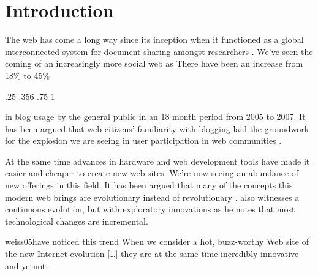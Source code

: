 \chapter{Introduction}
\label{chapter:introduction}

The web has come a long way since its inception when it functioned as a
global interconnected system for document sharing amongst researchers
\citep[]{bernerslee92}. We've
seen the coming of an increasingly more social web as
There have been
an increase from 18\% to 45\%
\begin{sparkline}{3}
  \sparkspike .25  .356
  \sparkspike .75  1
\end{sparkline}
in blog usage by the general public%
in an 18 month period from 2005 to 2007.
It has been argued that web citizens'
familiarity with blogging laid the groundwork for the explosion we are seeing
in user participation in web communities
.

At the same time advances in hardware and web development tools have made it
easier and cheaper to create new web sites. We're now seeing an
abundance of new offerings in this field.
It has been argued that many of the concepts this modern web brings are
evolutionary instead of revolutionary \citep[]{yakovlev07}.
\citet[]{treese06} also witnesses a continuous evolution, but with
exploratory innovations as he notes that most technological changes are
incremental.%
\begin{fullquote}[\p{18}]{weiss05}{have noticed this trend}
  When we consider a hot, buzz-worthy Web site of the new Internet evolution
  [\ldots]
  they are at the same time incredibly innovative and yet\dash{}not.
\end{fullquote}

